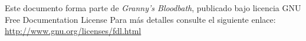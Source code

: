 Este documento forma parte de \emph{Granny's Bloodbath}, publicado bajo licencia GNU Free Documentation License
Para más detalles consulte el siguiente enlace:\\

\href{http://www.gnu.org/licenses/fdl.html}{http://www.gnu.org/licenses/fdl.html}
